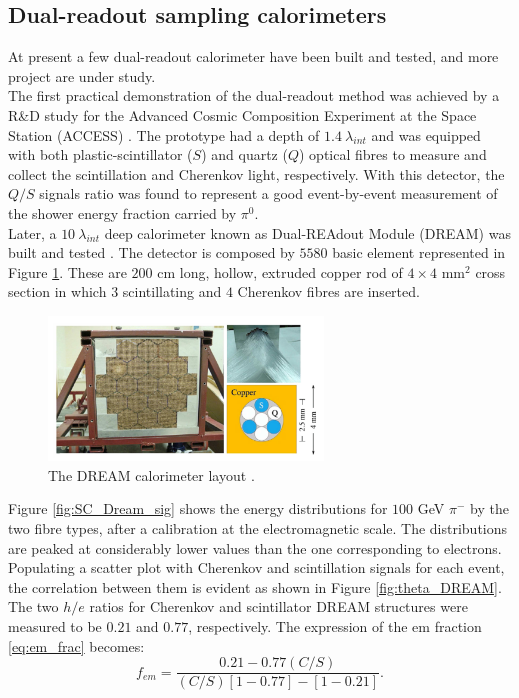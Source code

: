 \subsection{Dual-readout sampling calorimeters}
At present a few dual-readout calorimeter have been built and tested, and more project are under study.\\
The first practical demonstration of the dual-readout method was achieved by a R\&D study for the Advanced Cosmic Composition Experiment at the Space Station (ACCESS) \cite{ACCESS}. The prototype had a depth of $1.4\ \lambda_{int}$ and was equipped with both plastic-scintillator ($S$) and quartz ($Q$) optical fibres to measure and collect the scintillation and Cherenkov light, respectively. With this detector, the $Q/S$ signals ratio was found to represent a good event-by-event measurement of the shower energy fraction carried by $\pi^0$.\\

Later, a $10\ \lambda_{int}$ deep calorimeter known as Dual-REAdout Module (DREAM) was built and tested \cite{DREAM1, DREAM2}. 
The detector is composed by $5580$ basic element represented in Figure \ref{fig:DREAM}. These are $200$ cm long, hollow, extruded copper rod of $4\times 4$ mm$^2$ cross section in which $3$ scintillating and $4$ Cherenkov fibres are inserted.
\begin{figure}
	\centering
	\includegraphics[width=0.65\textwidth]{IMG/Cap2/DREAM.png}
	\caption{The DREAM calorimeter layout \cite{DREAM}.}
	\label{fig:DREAM}
\end{figure}

Figure \ref{fig:SC_Dream_sig} shows the energy distributions for $100$ GeV $\pi^-$ by the two fibre types, after a calibration at the electromagnetic scale. The distributions are peaked at considerably lower values than the one corresponding to electrons.
Populating a scatter plot with Cherenkov and scintillation signals for each event, the correlation between them is evident as shown in Figure \ref{fig:theta_DREAM}.
The two $h/e$ ratios for Cherenkov and scintillator DREAM structures were measured to be $0.21$ and $0.77$, respectively. The expression of the em fraction \ref{eq:em_frac} becomes:
\begin{equation}
    f_{em} = \frac{0.21-0.77(C/S)}{(C/S)\left[1-0.77\right]-\left[1-0.21\right]}.
\end{equation}

